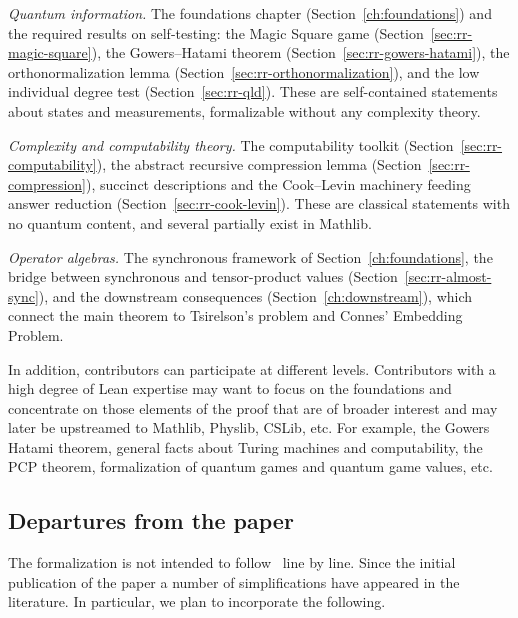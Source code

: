 \emph{Quantum information.} The foundations chapter
(Section~\ref{ch:foundations}) and the required results on self-testing: the Magic
Square game (Section~\ref{sec:rr-magic-square}), the Gowers--Hatami theorem
(Section~\ref{sec:rr-gowers-hatami}), the orthonormalization lemma
(Section~\ref{sec:rr-orthonormalization}), and the low individual degree test
(Section~\ref{sec:rr-qld}). These are self-contained statements about states and
measurements, formalizable without any complexity theory.

\emph{Complexity and computability theory.} The computability toolkit
(Section~\ref{sec:rr-computability}), the abstract recursive compression lemma
(Section~\ref{sec:rr-compression}), succinct descriptions and the Cook--Levin machinery
feeding answer reduction (Section~\ref{sec:rr-cook-levin}). These are classical
statements with no quantum content, and several partially exist in Mathlib.

\emph{Operator algebras.} The synchronous framework of
Section~\ref{ch:foundations}, the bridge between synchronous and tensor-product values
(Section~\ref{sec:rr-almost-sync}), and the downstream consequences
(Section~\ref{ch:downstream}), which connect the main theorem to Tsirelson's problem
and Connes' Embedding Problem.

In addition, contributors can participate at different levels. Contributors with a high degree of Lean expertise may want
to focus on the foundations and concentrate on those elements of the proof that are of broader interest and may later
be upstreamed to Mathlib, Physlib, CSLib, etc. For example, the Gowers Hatami theorem, general facts about Turing machines and computability, the PCP theorem,
formalization of quantum games and quantum game values, etc.

\subsection{Departures from the paper}
\label{sec:departures}

The formalization is not intended to follow~\cite{JNVWY20} line by line. Since the initial publication of the paper
a number of simplifications have appeared in the literature. In particular, we plan to incorporate the following.

